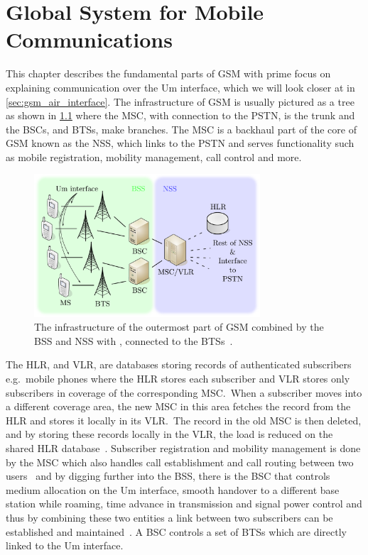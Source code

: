 \chapter{Global System for Mobile Communications}
This chapter describes the fundamental parts of \gls{GSM} with prime
focus on explaining communication over the Um interface, which we will
look closer at in \cref{sec:gsm_air_interface}. The infrastructure of
\gls{GSM} is usually pictured as a tree as shown in
\cref{fig:gsm_infrastructure} where the \gls{MSC}, with connection to
the \gls{PSTN}, is the trunk and the \glspl{BSC}, and \glspl{BTS},
make branches. The \gls{MSC} is a backhaul part of the core of GSM
known as the \gls{NSS}, which links to the \gls{PSTN} and serves
functionality such as mobile registration, mobility management, call
control and more.

\begin{figure}[H]
  \centering
  \includegraphics[width=0.75\textwidth]{figures/gsm_infrastructure}
  \caption{The infrastructure of the outermost part of \gls{GSM}
    combined by the BSS and NSS with ,
    connected to the \glspl{BTS}~\cite[p. 11, 21--44]{gsmtolte}.}
  \label{fig:gsm_infrastructure}
\end{figure}

The \gls{HLR}, and \gls{VLR}, are databases storing records of
authenticated subscribers e.g.\ mobile phones where the \gls{HLR}
stores each subscriber and \gls{VLR} stores only subscribers in
coverage of the corresponding \gls{MSC}.\ When a subscriber moves into
a different coverage area, the new \gls{MSC} in this area fetches the
record from the \gls{HLR} and stores it locally in its \gls{VLR}.\ The
record in the old \gls{MSC} is then deleted, and by storing these
records locally in the \gls{VLR}, the load is reduced on the shared
\gls{HLR} database~\cite[p. 13-17]{gsmtolte}. Subscriber registration
and mobility management is done by the \gls{MSC} which also handles
call establishment and call routing between two
users~\cite[p. 11-13]{gsmtolte} and by digging further into the
\gls{BSS}, there is the \gls{BSC} that controls medium allocation on
the Um interface, smooth handover to a different base station while
roaming, time advance in transmission and signal power control and
thus by combining these two entities a link between two subscribers
can be established and maintained~\cite[p. 30-34]{gsmtolte}. A
\gls{BSC} controls a set of \glspl{BTS} which are directly linked to
the Um interface.

